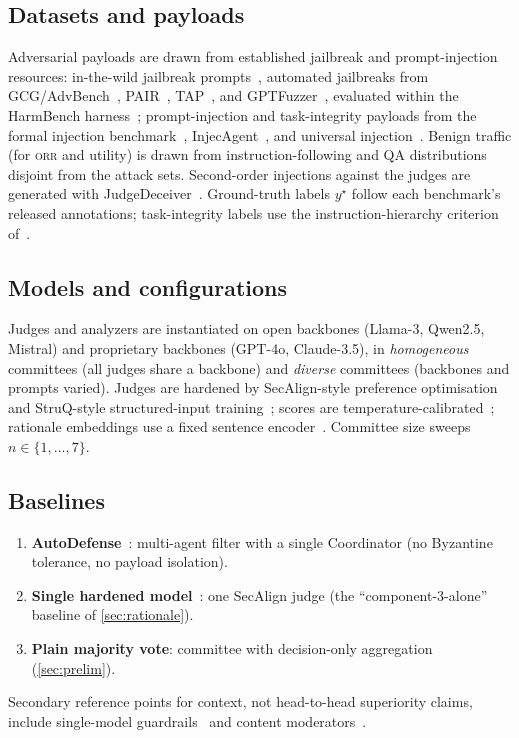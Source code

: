 \subsection{Datasets and payloads}
Adversarial payloads are drawn from established jailbreak and prompt-injection resources:
in-the-wild jailbreak prompts~\cite{shen2023dan}, automated jailbreaks from
GCG/AdvBench~\cite{zou2023universal}, PAIR~\cite{chao2023pair}, TAP~\cite{mehrotra2023tap},
and GPTFuzzer~\cite{yu2023gptfuzzer}, evaluated within the HarmBench
harness~\cite{mazeika2024harmbench}; prompt-injection and task-integrity payloads from the
formal injection benchmark~\cite{liu2024formalizing}, InjecAgent~\cite{zhan2024injecagent},
and universal injection~\cite{liu2024universal}. Benign traffic (for \textsc{orr} and
utility) is drawn from instruction-following and QA distributions disjoint from the attack
sets. Second-order injections against the judges are generated with
JudgeDeceiver~\cite{shi2024judgeinjection}. Ground-truth labels $y^\star$ follow each
benchmark's released annotations; task-integrity labels use the instruction-hierarchy
criterion of~\cite{wallace2024instruction}.

\subsection{Models and configurations}
Judges and analyzers are instantiated on open backbones (Llama-3, Qwen2.5, Mistral) and
proprietary backbones (GPT-4o, Claude-3.5), in \emph{homogeneous} committees (all judges
share a backbone) and \emph{diverse} committees (backbones and prompts varied). Judges are
hardened by SecAlign-style preference optimisation~\cite{chen2025secalign} and
StruQ-style structured-input training~\cite{chen2024struq}; scores are
temperature-calibrated~\cite{guo2017calibration}; rationale embeddings use a fixed
sentence encoder~\cite{reimers2019sentencebert}. Committee size sweeps $n\in\{1,\dots,7\}$.

\subsection{Baselines}
\begin{enumerate}[leftmargin=1.6em,itemsep=1pt,topsep=2pt]
  \item \textbf{AutoDefense}~\cite{zeng2024autodefense}: multi-agent filter with a single
        Coordinator (no Byzantine tolerance, no payload isolation).
  \item \textbf{Single hardened model}~\cite{chen2025secalign}: one SecAlign judge
        (the ``component-3-alone'' baseline of \cref{sec:rationale}).
  \item \textbf{Plain majority vote}: committee with decision-only aggregation
        (\cref{sec:prelim}).
\end{enumerate}
Secondary reference points for context, not head-to-head superiority claims, include
single-model guardrails~\cite{robey2023smoothllm,jain2023baseline} and content
moderators~\cite{inan2023llamaguard,zeng2024shieldgemma}.

